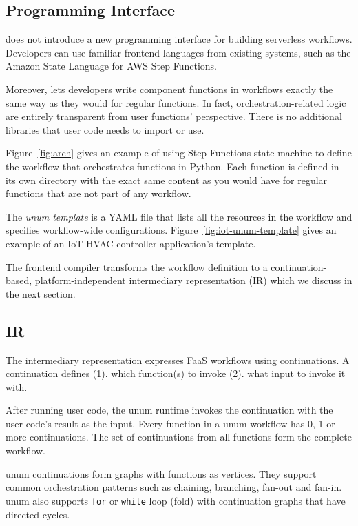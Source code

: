 \subsection{Programming Interface}\label{sec:design-interface}

\name{} does not introduce a new programming interface for building serverless
workflows. Developers can use familiar frontend languages from existing
systems, such as the Amazon State Language for AWS Step Functions.

Moreover, \name{} lets developers write component functions in
workflows exactly the same way as they would for regular functions. In fact,
orchestration-related logic are entirely transparent from user functions'
perspective. There is no additional libraries that user code needs to import
or use.

Figure~\ref{fig:arch} gives an example of using Step Functions state machine
to define the workflow that orchestrates functions in Python. Each
function is defined in its own directory with the exact same content as you
would have for regular functions that are not part of any workflow.

The \emph{unum template} is a YAML file that lists all the resources in the
workflow and specifies workflow-wide configurations.
Figure~\ref{fig:iot-unum-template} gives an example of an IoT HVAC controller
application's template.

The frontend compiler transforms the workflow definition to a
continuation-based, platform-independent intermediary representation (IR)
which we discuss in the next section.



\subsection{\name{} IR}\label{sec:design-ir}

The \name{} intermediary representation expresses FaaS workflows using
continuations. A continuation defines (1). which function(s) to invoke (2).
what input to invoke it with.

After running user code, the unum runtime invokes the continuation with the
user code's result as the input. Every function in a unum workflow has 0, 1 or
more continuations. The set of continuations from all functions form the
complete workflow.

unum continuations form graphs with functions as vertices. They support common
orchestration patterns such as chaining, branching, fan-out and fan-in. unum
also supports \texttt{for} or \texttt{while} loop (fold) with continuation
graphs that have directed cycles.

